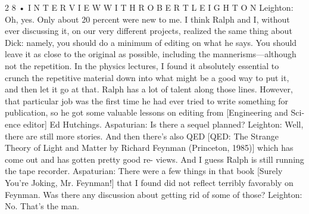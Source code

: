 \documentclass[10pt,oneside]{article}
\begin{document}
2 8 • I N T E R V I E W  W I T H  R O B E R T  L E I G H T O N Leighton: Oh, yes. Only about 20 percent were new to me. I think Ralph and I, without ever discussing it, on our very different projects, realized the same thing about Dick: namely, you should do a minimum of editing on what he says. You should leave it as close to the original as possible, including the mannerisms---although not the repetition. In the physics lectures, I found it absolutely essential to crunch the repetitive material down into what might be a good way to put it, and then let it go at that. Ralph has a lot of talent along those lines. However, that particular job was the first time he had ever tried to write something for publication, so he got some valuable lessons on editing from [Engineering and Sci- ence editor] Ed Hutchings. Aspaturian: Is there a sequel planned? Leighton: Well, there are still more stories. And then there’s also QED [QED: The Strange Theory of Light and Matter by Richard Feynman (Princeton, 1985)] which has come out and has gotten pretty good re- views. And I guess Ralph is still running the tape recorder. Aspaturian: There were a few things in that book [Surely You’re Joking, Mr. Feynman!] that I found did not reflect terribly favorably on Feynman. Was there any discussion about getting rid of some of those? Leighton: No. That’s the man.\par

\clearpage
{}
\end{document}
